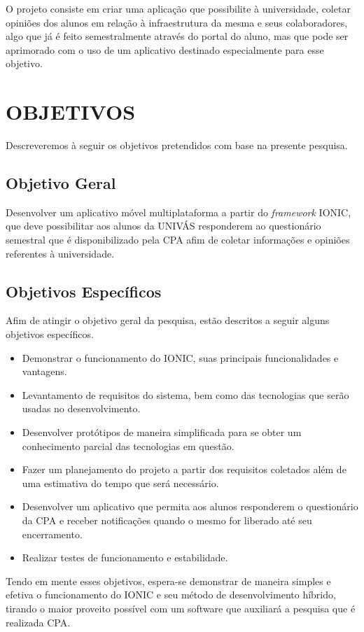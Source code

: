 	\par O projeto consiste em criar uma aplicação que possibilite à universidade, coletar opiniões dos alunos em relação à infraestrutura da mesma e seus colaboradores, algo que já é feito semestralmente através do portal do aluno, mas que pode ser aprimorado com o uso de um aplicativo destinado especialmente para esse objetivo.


\chapter{OBJETIVOS}

	\par Descreveremos à seguir os objetivos pretendidos com base na presente pesquisa.

\section{Objetivo Geral}

	\par Desenvolver um aplicativo móvel multiplataforma a partir do \textit{framework} IONIC, que deve possibilitar aos alunos da UNIVÁS responderem ao questionário semestral que é disponibilizado pela CPA afim de coletar informações e opiniões referentes à universidade.

\section{Objetivos Específicos}

	\par Afim de atingir o objetivo geral da pesquisa, estão descritos a seguir alguns objetivos específicos.
	\begin{itemize}
		\item Demonstrar o funcionamento do IONIC, suas principais funcionalidades e vantagens.
		\item Levantamento de requisitos do sistema, bem como das tecnologias que serão usadas no desenvolvimento.
		\item Desenvolver protótipos de maneira simplificada para se obter um conhecimento parcial das tecnologias em questão.
		\item Fazer um planejamento do projeto a partir dos requisitos coletados além de uma estimativa do tempo que será necessário.
		\item Desenvolver um aplicativo que permita aos alunos responderem o questionário da CPA e receber notificações quando o mesmo for liberado até seu encerramento.
		\item Realizar testes de funcionamento e estabilidade.
	\end{itemize}
	\par Tendo em mente esses objetivos, espera-se demonstrar de maneira simples e efetiva o funcionamento do IONIC e seu método de desenvolvimento híbrido, tirando o maior proveito possível com um software que auxiliará a pesquisa que é realizada CPA.

